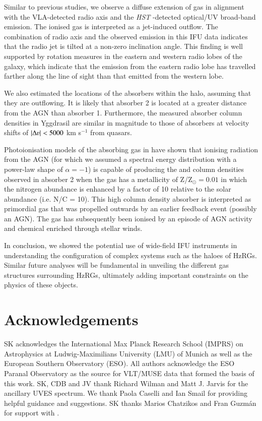 Similar to previous studies, we observe a diffuse extension of  gas in alignment with the VLA-detected radio axis and the {\it HST} -detected optical/UV broad-band emission. The ionised gas is interpreted as a jet-induced outflow. The combination of radio axis and the observed  emission in this IFU data indicates that the radio jet is tilted at a non-zero inclination angle. This finding is well supported by rotation measures in the eastern and western radio lobes of the galaxy, which indicate that the emission from the eastern radio lobe has travelled farther along the line of sight than that emitted from the western lobe.

We also estimated the locations of the absorbers within the halo, assuming that they are outflowing. It is likely that absorber 2 is located at a greater distance from the AGN than absorber 1. Furthermore, the measured absorber  column densities in Yggdrasil are similar in magnitude to those of absorbers at velocity shifts of $\lvert \Delta \varv \rvert < 5000$ km s$^{-1}$ from quasars. 

Photoionisation models of the absorbing gas in  have shown that ionising radiation from the AGN (for which we assumed a spectral energy distribution with a power-law shape of $\alpha=-1$) is capable of producing the  and  column densities observed in absorber 2 when the gas has a metallicity of Z/Z$_\odot = 0.01$ in which the nitrogen abundance is enhanced by a factor of 10 relative to the solar abundance (i.e. N/C = 10). This high column density absorber is interpreted as primordial gas that was propelled outwards by an earlier feedback event (possibly an AGN). The gas has subsequently been ionised by an episode of AGN activity and chemical enriched through stellar winds. 

In conclusion, we showed the potential use of wide-field IFU instruments in understanding  the configuration of complex systems such as the haloes of HzRGs. Similar future analyses will be fundamental in unveiling the different gas structures surrounding HzRGs, ultimately adding important constraints on the physics of these objects.

\section*{Acknowledgements}
SK acknowledges the International Max Planck Research School (IMPRS) on Astrophysics at Ludwig-Maximilians University (LMU) of Munich as well as the European Southern Observatory (ESO). All authors acknowledge the ESO Paranal Observatory as the source for VLT/MUSE data that formed the basis of this work. SK, CDB and JV thank Richard Wilman and Matt J. Jarvis for the ancillary UVES spectrum. We thank Paola Caselli and Ian Smail for providing helpful guidance and suggestions. SK thanks Marios Chatzikos and Fran Guzm{\'a}n for support with .  
  
